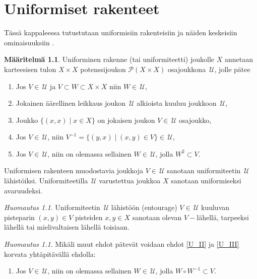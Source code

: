 \documentclass[12pt,a4paper,leqno]{report}
\newcommand{\U}{\,\mathcal{U}}
\newcommand{\Pot}{\mathcal{P}}
\theoremstyle{plain}
\theoremstyle{definition}
\newtheorem{maar}[equation]{Määritelmä}
\theoremstyle{remark}
\newtheorem{huom}[equation]{Huomautus}
\begin{document}
\chapter{Uniformiset rakenteet}
Tässä kappaleessa tutustutaan uniformisiin rakenteisiin ja näiden keskeisiin ominaisuuksiin \cite{Eom1}.
\begin{maar}\label{uniformi_maar}
Uniforminen rakenne (tai uniformiteetti) joukolle $X$ annetaan karteesisen tulon $X\times X$ potenssijoukon $\Pot(X\times X)$ osajoukkona $\U$, jolle pätee %
\begin{enumerate} [label=(U\arabic*),ref=(U\arabic*)]
\item\label{F_I} Jos $V\in \U$ ja $V\subset W\subset X\times X$ niin $ W\in\U$,
\item\label{F_II} Jokainen äärellinen leikkaus joukon $\U$ alkioista kuuluu joukkoon $\U$,
\item\label{U_I} Joukko $\{(x,x)\mid x\in X\}$ on jokaisen joukon $V\in\U$ osajoukko,
\item\label{U_II} Jos $V\in\U$, niin $V^{-1}=\{(y,x)\mid (x,y)\in V\}\in\U$,
\item\label{U_III} Jos $V\in \U$, niin on olemassa sellainen $W\in \U$, jolla $ W^2\subset V$.%
\end{enumerate}
Uniformisen rakenteen muodostavia joukkoja $ V\in\U$ sanotaan uniformiteetin $\U$ lähistöiksi. 
Uniformiteetilla $\U$ varustettua joukkoa $X$ sanotaan uniformiseksi avaruudeksi.
\end{maar}
\begin{huom}\label{V-close}
Uniformiteetin $\U$ lähistöön (entourage) $V\in\U $ kuuluvan 
pisteparin $(x,y)\in V$ pisteiden $x,y\in X$ sanotaan olevan $V-$lähellä, 
tarpeeksi lähellä tai mielivaltaisen lähellä toisiaan.
\end{huom}
\begin{huom}\label{UaHuom}
Mikäli muut ehdot pätevät voidaan ehdot \ref{U_II} ja \ref{U_III} korvata yhtäpitävällä ehdolla: 
\begin{enumerate} [label=(Ua),ref=(Ua)]
\item \label{Uaehto} 
Jos $V\in \U$, niin on olemassa sellainen $W\in \U$, jolla $ W\circ W^{-1}\subset V$.
\end{enumerate}
%
\end{huom}
\end{document}
